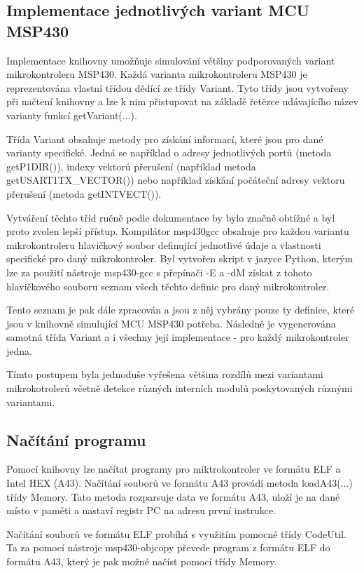 \subsection{Implementace jednotlivých variant MCU MSP430}

Implementace knihovny umožňuje simulování většiny podporovaných variant mikrokontroleru MSP430. Každá varianta mikrokontroleru MSP430 je reprezentována vlastní třídou dědící ze třídy Variant. Tyto třídy jsou vytvořeny při načtení knihovny a lze k nim přistupovat na základě řetězce udávajícího název varianty funkcí getVariant(...).

Třída Variant obsahuje metody pro získání informací, které jsou pro dané varianty specifické. Jedná se například o adresy jednotlivých portů (metoda getP1DIR()), indexy vektorů přerušení (například metoda getUSART1TX\_VECTOR()) nebo například získání počáteční adresy vektoru přerušení (metoda getINTVECT()).

Vytváření těchto tříd ručně podle dokumentace by bylo značně obtížné a byl proto zvolen lepší přístup. Kompilátor msp430gcc obsahuje pro každou variantu mikrokontroleru hlavičkový soubor definující jednotlivé údaje a vlastnosti specifické pro daný mikrokontroler. Byl vytvořen skript v jazyce Python, kterým lze za použití nástroje msp430-gcc s přepínači -E a -dM získat z tohoto hlavičkového souboru seznam všech těchto definic pro daný mikrokontroler.

Tento seznam je pak dále zpracován a jsou z něj vybrány pouze ty definice, které jsou v knihovně simulující MCU MSP430 potřeba. Následně je vygenerována samotná třída Variant a i všechny její implementace - pro každý mikrokontroler jedna.

Tímto postupem byla jednoduše vyřešena většina rozdílů mezi variantami mikrokotrolerů včetně detekce různých interních modulů poskytovaných různými variantami.

\subsection{Načítání programu}

Pomocí knihovny lze načítat programy pro miktrokontroler ve formátu ELF a Intel HEX (A43). Načítání souborů ve formátu A43 provádí metoda loadA43(...) třídy Memory. Tato metoda rozparsuje data ve formátu A43, uloží je na dané místo v paměti a nastaví registr PC na adresu první instrukce.

Načítání souborů ve formátu ELF probíhá s využitím pomocné třídy CodeUtil. Ta za pomocí nástroje msp430-objcopy převede program z formátu ELF do formátu A43, který je pak možné načíst pomocí třídy Memory.

